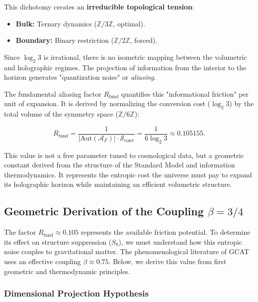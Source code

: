 \documentclass[12pt, a4paper]{article}
\theoremstyle{plain}
\theoremstyle{definition}
\begin{document}
This dichotomy creates an \textbf{irreducible topological tension}:
\begin{itemize}
    \item \textbf{Bulk:} Ternary dynamics ($\mathbb{Z}/3\mathbb{Z}$, optimal).
    \item \textbf{Boundary:} Binary restriction ($\mathbb{Z}/2\mathbb{Z}$, forced).
\end{itemize}

Since $\log_2 3$ is irrational, there is no isometric mapping between the volumetric and holographic regimes. The projection of information from the interior to the horizon generates "quantization noise" or \textit{aliasing}. 

The fundamental aliasing factor $R_{\text{fund}}$ quantifies this "informational friction" per unit of expansion. It is derived by normalizing the conversion cost ($\log_2 3$) by the total volume of the symmetry space ($\mathbb{Z}/6\mathbb{Z}$):

\begin{equation}
R_{\text{fund}} = \frac{1}{|\text{Aut}(\mathcal{A}_F)| \cdot \mathcal{S}_{\text{conv}}} = \frac{1}{6 \log_2 3} \approx 0.105155.
\label{eq:rfund_derivation}
\end{equation}

This value is not a free parameter tuned to cosmological data, but a geometric constant derived from the structure of the Standard Model and information thermodynamics. It represents the entropic cost the universe must pay to expand its holographic horizon while maintaining an efficient volumetric structure.

\subsection{Geometric Derivation of the Coupling \texorpdfstring{$\beta = 3/4$}{beta=3/4}}
\label{subsec:beta_derivation}

The factor $R_{\text{fund}} \approx 0.105$ represents the available friction potential. To determine its effect on structure suppression ($S_8$), we must understand how this entropic noise couples to gravitational matter. The phenomenological literature of GCAT uses an effective coupling $\beta \approx 0.75$. Below, we derive this value from first geometric and thermodynamic principles.

\subsubsection{Dimensional Projection Hypothesis}
\end{document}
